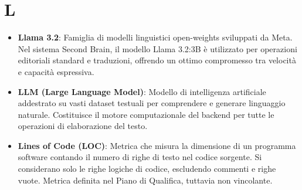 \documentclass[11pt,a4paper]{article}
\begin{document}
\section*{L}
\begin{itemize}
\item \textbf{Llama 3.2}: Famiglia di modelli linguistici open-weights sviluppati da Meta. Nel sistema Second Brain, il modello Llama 3.2:3B è utilizzato per operazioni editoriali standard e traduzioni, offrendo un ottimo compromesso tra velocità e capacità espressiva.

\item \textbf{LLM (Large Language Model)}: Modello di intelligenza artificiale addestrato su vasti dataset testuali per comprendere e generare linguaggio naturale. Costituisce il motore computazionale del backend per tutte le operazioni di elaborazione del testo.

\item \textbf{Lines of Code (LOC)}: Metrica che misura la dimensione di un programma software contando il numero di righe di testo nel codice sorgente. Si considerano solo le righe logiche di codice, escludendo commenti e righe vuote. Metrica definita nel Piano di Qualifica, tuttavia non vincolante.
\end{itemize}
\newpage
\end{document}
